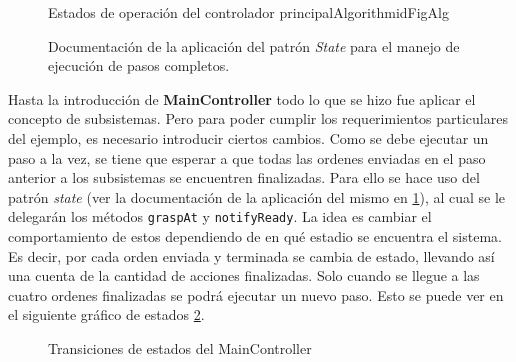 \begin{figure}[H]
\caption{Documentación de la aplicación del patrón \textit{State} para el manejo de ejecución de pasos completos.}
\label{docEstateMain}
\begin{pattern}[]{Estados de operación del controlador principal}{Algorithm}{idFigAlg}
\assigns
{}

\end{pattern}
\end{figure}
\FloatBarrier


Hasta la introducción de \textbf{MainController} todo lo que se hizo fue aplicar el concepto de subsistemas. Pero para poder cumplir los requerimientos particulares del ejemplo, es necesario introducir ciertos cambios. Como se debe ejecutar un paso a la vez, se tiene que esperar a que todas las ordenes enviadas en el paso anterior a los subsistemas se encuentren finalizadas. Para ello se hace uso del patrón \textit{state} (ver la documentación de la aplicación del mismo en \ref{docEstateMain}), al cual se le delegarán los métodos \verb|graspAt| y \verb|notifyReady|. La idea es cambiar el comportamiento de estos dependiendo de en qué estadio se encuentra el sistema. Es decir, por cada orden enviada y terminada se cambia de estado, llevando así una cuenta de la cantidad de acciones finalizadas. Solo cuando se llegue a las cuatro ordenes finalizadas se podrá ejecutar un nuevo paso. Esto se puede ver en el siguiente gráfico de estados \ref{statesMainController}.

\begin{figure}[H]
\caption{Transiciones de estados del MainController}
\label{statesMainController}
\begin{center}
\end{center}
\end{figure}

